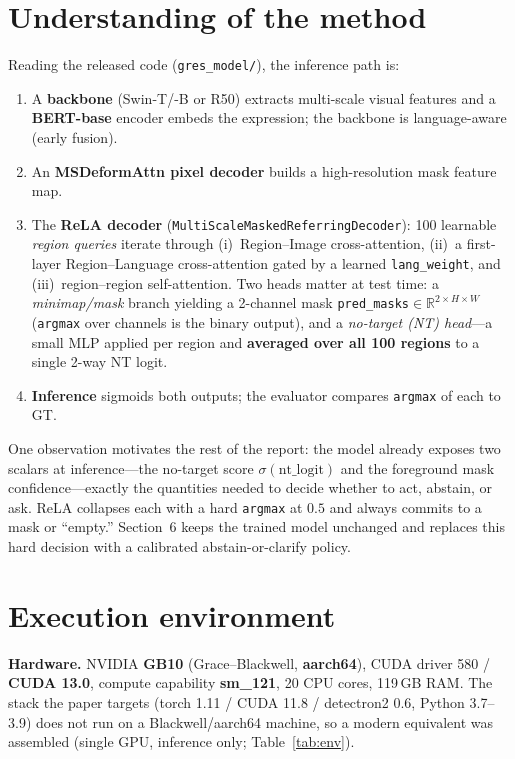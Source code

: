 \documentclass[11pt]{article}
\newcommand{\code}[1]{\texttt{\small #1}}
\begin{document}
\section{Understanding of the method}
Reading the released code (\code{gres\_model/}), the inference path is:
\begin{enumerate}
\item A \textbf{backbone} (Swin-T/-B or R50) extracts multi-scale visual features and a
\textbf{BERT-base} encoder embeds the expression; the backbone is language-aware (early fusion).
\item An \textbf{MSDeformAttn pixel decoder} builds a high-resolution mask feature map.
\item The \textbf{ReLA decoder} (\code{MultiScaleMaskedReferringDecoder}): 100 learnable
\emph{region queries} iterate through (i)~Region--Image cross-attention, (ii)~a first-layer
Region--Language cross-attention gated by a learned \code{lang\_weight}, and (iii)~region--region
self-attention. Two heads matter at test time: a \emph{minimap/mask} branch yielding a 2-channel
mask \code{pred\_masks}$\in\mathbb{R}^{2\times H\times W}$ (\code{argmax} over channels is the
binary output), and a \emph{no-target (NT) head}---a small MLP applied per region and
\textbf{averaged over all 100 regions} to a single 2-way NT logit.
\item \textbf{Inference} sigmoids both outputs; the evaluator compares \code{argmax} of each to GT.
\end{enumerate}
One observation motivates the rest of the report: the model already exposes two scalars at
inference---the no-target score $\sigma(\mathrm{nt\_logit})$ and the foreground mask
confidence---exactly the quantities needed to decide whether to act, abstain, or ask. ReLA collapses
each with a hard \code{argmax} at $0.5$ and always commits to a mask or ``empty.'' Section~6 keeps the
trained model unchanged and replaces this hard decision with a calibrated abstain-or-clarify policy.

\section{Execution environment}
\textbf{Hardware.} NVIDIA \textbf{GB10} (Grace--Blackwell, \textbf{aarch64}), CUDA driver 580 /
\textbf{CUDA 13.0}, compute capability \textbf{sm\_121}, 20 CPU cores, 119\,GB RAM.
The stack the paper targets (torch 1.11 / CUDA 11.8 / detectron2 0.6, Python 3.7--3.9) does not run
on a Blackwell/aarch64 machine, so a modern equivalent was assembled (single GPU, inference only;
Table~\ref{tab:env}).
\end{document}
